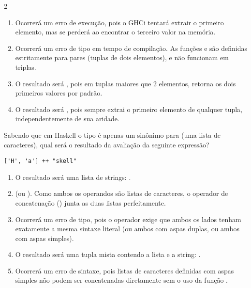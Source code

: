 \documentclass[a4paper,10pt,brazil]{article}
\begin{document}
\begin{multicols}{2}
\begin{enumerate}
  \item Ocorrerá um erro de execução, pois o GHCi tentará extrair o primeiro elemento, mas se perderá ao encontrar o terceiro valor na memória.

  \item Ocorrerá um erro de tipo em tempo de compilação. As funções  e  são definidas estritamente para pares (tuplas de dois elementos), e não funcionam em triplas.

  \item O resultado será , pois em tuplas maiores que 2 elementos,  retorna os dois primeiros valores por padrão.

  \item O resultado será , pois  sempre extrai o primeiro elemento de qualquer tupla, independentemente de sua aridade.


\end{enumerate}

Sabendo que em Haskell o tipo  é apenas um sinônimo para \haskellinline{[Char]} (uma lista de caracteres), qual será o resultado da avaliação da seguinte expressão?
\begin{verbatim}
['H', 'a'] ++ "skell"
\end{verbatim}

\begin{enumerate}
  \item O resultado será uma lista de strings: \haskellinline{["Ha", "skell"]}.

  \item {} (ou \haskellinline{['H', 'a', 's', 'k', 'e', 'l', 'l']}). Como ambos os operandos são listas de caracteres, o operador de concatenação (\haskellinline{++}) junta as duas listas perfeitamente.

  \item Ocorrerá um erro de tipo, pois o operador \haskellinline{++} exige que ambos os lados tenham exatamente a mesma sintaxe literal (ou ambos com aspas duplas, ou ambos com aspas simples).

  \item O resultado será uma tupla mista contendo a lista e a string: .

  \item Ocorrerá um erro de sintaxe, pois listas de caracteres definidas com aspas simples não podem ser concatenadas diretamente sem o uso da função .



\end{enumerate}
\end{multicols}
\end{document}
